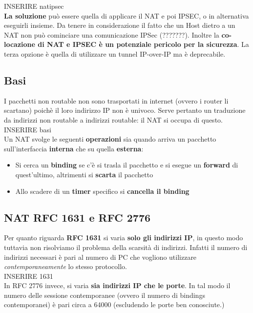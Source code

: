 \documentclass[12pt]{article}
\begin{document}
			INSERIRE natipsec\\
			
			\textbf{La soluzione} può essere quella di applicare il NAT e poi IPSEC, o in alternativa eseguirli insieme. Da tenere in considerazione il fatto che un Host dietro a un NAT non può cominciare una comunicazione IPSec (???????). Inoltre la \textbf{co-locazione di NAT e IPSEC è un potenziale pericolo per la sicurezza}. La terza opzione è quella di utilizzare un tunnel IP-over-IP ma è deprecabile.
		\subsection{Basi}
			I pacchetti non routable non sono trasportati in internet (ovvero i router li scartano) poichè il loro indirizzo IP non è univoco. Serve pertanto un traduzione da indirizzi non routable a indirizzi routable: il NAT si occupa di questo.\\
			
			INSERIRE basi\\
			
			Un NAT svolge le seguenti \textbf{operazioni} sia quando arriva un pacchetto sull'interfaccia \textbf{interna} che su quella \textbf{esterna}:
			\begin{itemize}
				\item Si cerca un \textbf{binding} se c'è si trasla il pacchetto e si esegue un \textbf{forward} di quest'ultimo, altrimenti si \textbf{scarta} il pacchetto
				\item Allo scadere di un \textbf{timer} specifico si \textbf{cancella il binding}
			\end{itemize}
		\subsection{NAT RFC 1631 e RFC 2776 }  
			Per quanto riguarda \textbf{RFC 1631} si varia \textbf{solo gli indirizzi IP}, in questo modo tuttavia non risolviamo il problema della scarsità di indirizzi. Infatti il numero di indirizzi necessari è pari al numero di PC che vogliono utilizzare \textit{contemporaneamente} lo stesso protocollo.\\
			
			INSERIRE 1631\\
			
			In RFC 2776 invece, si varia \textbf{sia indirizzi IP che le porte}. In tal modo il numero delle sessione contemporanee (ovvero il numero di bindings contemporanei) è pari circa a 64000 (escludendo le porte ben conosciute.)
\end{document}
